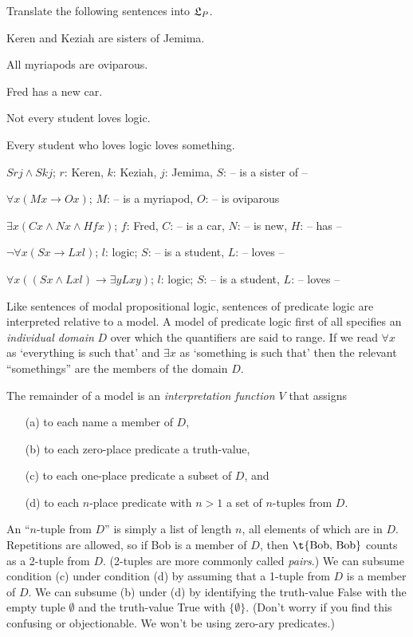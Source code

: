 \begin{exercise}
  Translate the following sentences into $\mathfrak{L}_P$.
  \begin{exlist}
  \item Keren and Keziah are sisters of Jemima.
  \item All myriapods are oviparous.
  \item Fred has a new car.
  \item Not every student loves logic.
  \item Every student who loves logic loves something.
  \end{exlist}
\end{exercise}
\begin{solution}
  \begin{sollist}
  \item $Srj \land Skj$; \qquad $r$: Keren, $k$: Keziah, $j$: Jemima, $S$: -- is a sister of --
  \item $\forall x (Mx \to Ox)$; \qquad $M$: -- is a myriapod, $O$: -- is oviparous 
  \item $\exists x (Cx \land Nx \land Hfx)$; \qquad $f$: Fred, $C$: -- is a car, $N$: -- is new, $H$: -- has --
  \item $\neg\forall x (Sx \to Lxl)$; \qquad $l$: logic; $S$: -- is a student, $L$: -- loves --
  \item $\forall x ((Sx \land Lxl) \to \exists y Lxy)$; \qquad $l$: logic; $S$: -- is a student, $L$: -- loves --
  \end{sollist}
\end{solution}

Like sentences of modal propositional logic, sentences of predicate logic are
interpreted relative to a model. A model of predicate logic first of all
specifies an \emph{individual domain} $D$ over which the quantifiers are said to
range. If we read $\forall x$ as `everything is such that' and $\exists x$ as
`something is such that' then the relevant ``somethings'' are the members of the
domain $D$.

The remainder of a model is an \emph{interpretation function $V$} that assigns
\begin{itemize}[leftmargin=10mm]
  \itemsep-1mm
  \item[(a)] to each name a member of $D$,
  \item[(b)] to each zero-place predicate a truth-value,
  \item[(c)] to each one-place predicate a subset of $D$, and
  \item[(d)] to each $n$-place predicate with $n>1$ a set of $n$-tuples from
        $D$.
\end{itemize}
An ``$n$-tuple from $D$'' is simply a list of length $n$, all elements of which
are in $D$. Repetitions are allowed, so if Bob is a member of $D$, then
$\t{\text{Bob, Bob}}$ counts as a 2-tuple from $D$. (2-tuples are more commonly
called \emph{pairs}.) We can subsume condition (c) under condition (d) by
assuming that a 1-tuple from $D$ is a member of $D$. We can subsume (b) under
(d) by identifying the truth-value False with the empty tuple $\emptyset$ and
the truth-value True with $\{ \emptyset \}$. (Don't worry if you find this confusing or objectionable. We won't be using zero-ary predicates.)


